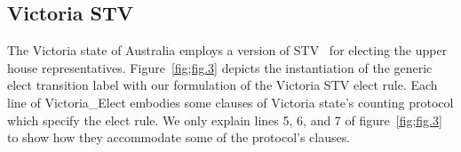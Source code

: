 \documentclass{llncs}
\begin{document}
\subsection{Victoria STV}
The Victoria state of Australia employs a version of STV~\cite{} for  electing the upper house representatives. 
Figure~\ref{fig;fig.3} depicts the instantiation of the generic elect transition label with our formulation of the Victoria STV elect rule. Each line of {\selectfont Victoria\_Elect} embodies some clauses of Victoria state's counting protocol which specify the elect rule. We only explain lines 5, 6, and 7 of figure~\ref{fig;fig.3} to show how they accommodate some  of the protocol's clauses. 
\end{document}
